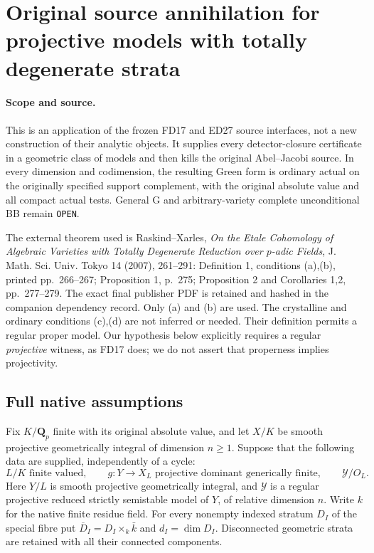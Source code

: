 \section{Original source annihilation for projective models with totally degenerate strata}
\label{sc2td:section}

\paragraph{Scope and source.}
This is an application of the frozen FD17 and ED27 source interfaces,
not a new construction of their analytic objects. It supplies every
detector-closure certificate in a geometric class of models and then
kills the original Abel--Jacobi source. In every dimension and codimension,
the resulting Green form is ordinary actual on the originally specified
support complement, with the original absolute value and all compact
actual tests. General G and arbitrary-variety complete unconditional BB
remain \texttt{OPEN}.

The external theorem used is Raskind--Xarles, \emph{On the Etale
Cohomology of Algebraic Varieties with Totally Degenerate Reduction over
$p$-adic Fields}, J. Math. Sci. Univ. Tokyo 14 (2007), 261--291:
Definition 1, conditions (a),(b), printed pp.~266--267;
Proposition 1, p.~275; Proposition 2 and Corollaries 1,2,
pp.~277--279. The exact final publisher PDF is retained and hashed
in the companion dependency record. Only (a) and (b) are used.
The crystalline and ordinary conditions (c),(d) are not inferred or needed.
Their definition permits a regular proper model. Our hypothesis below
explicitly requires a regular \emph{projective} witness, as FD17 does;
we do not assert that properness implies projectivity.

\subsection{Full native assumptions}

Fix $K/\mathbf Q_p$ finite with its original absolute value, and let
$X/K$ be smooth projective geometrically integral of dimension $n\geq1$.
Suppose that the following data are supplied, independently of a cycle:
\[
 L/K\text{ finite valued},\qquad
 g:Y\longrightarrow X_L\text{ projective dominant generically finite},
 \qquad \mathcal Y/O_L.
 \tag{TDR2.1}
\]
Here $Y/L$ is smooth projective geometrically integral, and
$\mathcal Y$ is a regular projective reduced strictly semistable model
of $Y$, of relative dimension $n$. Write $k$ for the native finite
residue field. For every nonempty indexed stratum $D_I$ of the special
fibre put $\overline D_I=D_I\times_k\bar k$ and
$d_I=\dim D_I$. Disconnected geometric strata are retained with all
their connected components.


